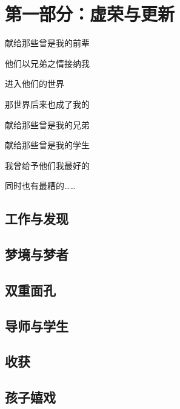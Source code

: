 \part{第一部分：虚荣与更新}

\newpage

\begin{center}
    献给那些曾是我的前辈
    
    他们以兄弟之情接纳我
    
    进入他们的世界
    
    那世界后来也成了我的

    \vspace{1cm}

    献给那些曾是我的兄弟
    
    献给那些曾是我的学生
    
    我曾给予他们我最好的
    
    同时也有最糟的……
\end{center}

\newpage

\chapter{工作与发现}




\chapter{梦境与梦者}











\chapter{双重面孔}









\chapter{导师与学生}








\chapter{收获}









\chapter{孩子嬉戏}



